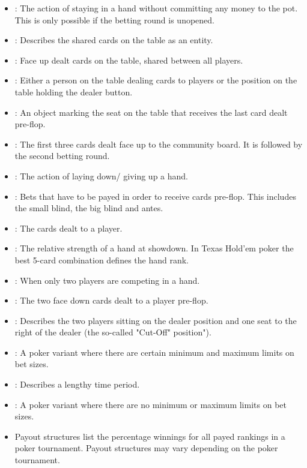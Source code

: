 \begin{appendices}
\begin{itemize}
\item {}:
The action of staying in a hand without committing any money to the pot. This is only possible if the betting round is unopened.
\item {}:
Describes the shared cards on the table as an entity.
\item {}:
Face up dealt cards on the table, shared between all players.
\item {}:
Either a person on the table dealing cards to players or the position on the table holding the dealer button.
\item {}:
An object marking the seat on the table that receives the last card dealt pre-flop. 
\item {}: The first three cards dealt face up to the community board. It  is followed by the second betting round.
\item {}: 
The action of laying down/ giving up a hand.
\item {}:
Bets that have to be payed in order to receive cards pre-flop. This includes the small blind, the big blind and antes.
\item {}:
The cards dealt to a player.
\item {}:
The relative strength of a hand at showdown. In Texas Hold'em poker the best 5-card combination defines the hand rank.
\item {}:
When only two players are competing in a hand.
\item {}:
The two face down cards dealt to a player pre-flop.
\item {}:
Describes the two players sitting on the dealer position and one seat to the right of the dealer (the so-called "Cut-Off" position").
\item {}:
A poker variant where there are certain minimum and maximum limits on bet sizes.
\item {}:
Describes a lengthy time period.
\item {}:
A poker variant where there are no minimum or maximum limits on bet sizes.
\item {}
Payout structures list the percentage winnings for all payed rankings in a poker tournament. Payout structures may vary depending on the poker tournament.

\end{itemize}
\end{appendices}
